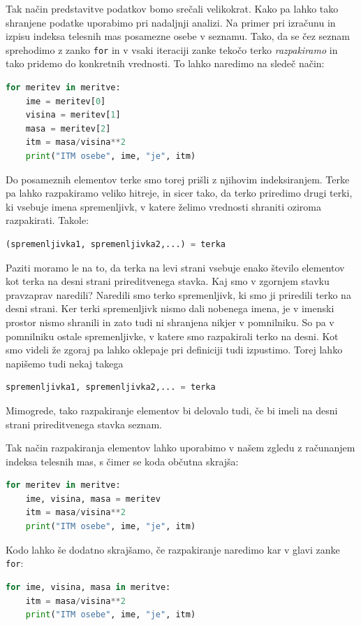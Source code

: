 Tak način predstavitve podatkov bomo srečali velikokrat. Kako pa lahko tako shranjene podatke uporabimo pri nadaljnji analizi. Na primer pri izračunu in izpisu indeksa telesnih mas posamezne osebe v seznamu. Tako, da se čez seznam sprehodimo z zanko \texttt{for} in v vsaki iteraciji zanke tekočo terko \emph{razpakiramo} in tako pridemo do konkretnih vrednosti. To lahko naredimo na sledeč način: 
\begin{lstlisting}[language=Python, showstringspaces=false]
for meritev in meritve:
    ime = meritev[0]
    visina = meritev[1]
    masa = meritev[2]
    itm = masa/visina**2
    print("ITM osebe", ime, "je", itm)
\end{lstlisting}
Do posameznih elementov terke smo torej prišli z njihovim indeksiranjem. Terke pa lahko razpakiramo veliko hitreje, in sicer tako, da terko priredimo drugi terki, ki vsebuje imena spremenljivk, v katere želimo vrednosti shraniti oziroma razpakirati. Takole:
\begin{lstlisting}[language=Python, showstringspaces=false]
(spremenljivka1, spremenljivka2,...) = terka
\end{lstlisting}
Paziti moramo le na to, da terka na levi strani vsebuje enako število elementov kot terka na desni strani prireditvenega stavka. Kaj smo v zgornjem stavku pravzaprav naredili? Naredili smo terko spremenljivk, ki smo ji priredili terko na desni strani. Ker terki spremenljivk nismo dali nobenega imena, je v imenski prostor nismo shranili in zato tudi ni shranjena nikjer v pomnilniku. So pa v pomnilniku ostale spremenljivke, v katere smo razpakirali terko na desni. Kot smo videli že zgoraj pa lahko oklepaje pri definiciji tudi izpustimo. Torej lahko napišemo tudi nekaj takega
\begin{lstlisting}[language=Python, showstringspaces=false]
spremenljivka1, spremenljivka2,... = terka
\end{lstlisting}
Mimogrede, tako razpakiranje elementov bi delovalo tudi, če bi imeli na desni strani prireditvenega stavka seznam.

Tak način razpakiranja elementov lahko uporabimo v našem zgledu z računanjem indeksa telesnih mas, s čimer se koda občutna skrajša:
\begin{lstlisting}[language=Python, showstringspaces=false]
for meritev in meritve:
    ime, visina, masa = meritev
    itm = masa/visina**2
    print("ITM osebe", ime, "je", itm)
\end{lstlisting}
Kodo lahko še dodatno skrajšamo, če razpakiranje naredimo kar v glavi zanke \texttt{for}:
\begin{lstlisting}[language=Python, showstringspaces=false]
for ime, visina, masa in meritve:
    itm = masa/visina**2
    print("ITM osebe", ime, "je", itm)
\end{lstlisting}

